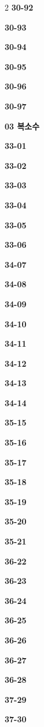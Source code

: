 \documentclass[10pt,a4paper]{article}
\begin{document}
\begin{multicols}{2}
\noindent\textbf{30-92}\ \par
\noindent\textbf{30-93}\ \par
\noindent\textbf{30-94}\ \par
\noindent\textbf{30-95}\ \par
\noindent\textbf{30-96}\ \par
\noindent\textbf{30-97}\ \par
\noindent\textbf{03 복소수}\par\smallskip
\noindent\textbf{33-01}\ \par
\noindent\textbf{33-02}\ \par
\noindent\textbf{33-03}\ \par
\noindent\textbf{33-04}\ \par
\noindent\textbf{33-05}\ \par
\noindent\textbf{33-06}\ \par
\noindent\textbf{34-07}\ \par
\noindent\textbf{34-08}\ \par
\noindent\textbf{34-09}\ \par
\noindent\textbf{34-10}\ \par
\noindent\textbf{34-11}\ \par
\noindent\textbf{34-12}\ \par
\noindent\textbf{34-13}\ \par
\noindent\textbf{34-14}\ \par
\noindent\textbf{35-15}\ \par
\noindent\textbf{35-16}\ \par
\noindent\textbf{35-17}\ \par
\noindent\textbf{35-18}\ \par
\noindent\textbf{35-19}\ \par
\noindent\textbf{35-20}\ \par
\noindent\textbf{35-21}\ \par
\noindent\textbf{36-22}\ \par
\noindent\textbf{36-23}\ \par
\noindent\textbf{36-24}\ \par
\noindent\textbf{36-25}\ \par
\noindent\textbf{36-26}\ \par
\noindent\textbf{36-27}\ \par
\noindent\textbf{36-28}\ \par
\noindent\textbf{37-29}\ \par
\noindent\textbf{37-30}\ \par

\end{multicols}
\end{document}
